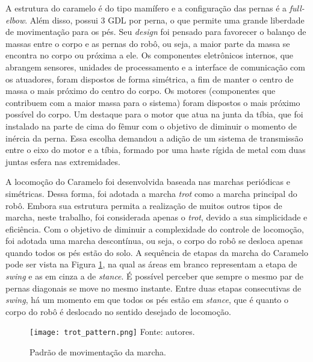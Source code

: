 \documentclass[../main.tex]{subfiles}
\begin{document}
A estrutura do caramelo é do tipo mamífero e a configuração das pernas é a \textit{full-elbow}. Além disso, possui 3 GDL por perna, o que permite uma grande liberdade de movimentação para os pés. Seu \textit{design} foi pensado para favorecer o balanço de massas entre o corpo e as pernas do robô, ou seja, a maior parte da massa se encontra no corpo ou próxima a ele. Os componentes eletrônicos internos, que abrangem sensores, unidades de processamento e a interface de comunicação com os atuadores, foram dispostos de forma simétrica, a fim de manter o centro de massa o mais próximo do centro do corpo. Os motores (componentes que contribuem com a maior massa para o sistema) foram dispostos o mais próximo possível do corpo. Um destaque para o motor que atua na junta da tíbia, que foi instalado na parte de cima do fêmur com o objetivo de diminuir o momento de inércia da perna. Essa escolha demandou a adição de um sistema de transmissão entre o eixo do motor e a tíbia, formado por uma haste rígida de metal com duas juntas esfera nas extremidades.

A locomoção do Caramelo foi desenvolvida baseada nas marchas periódicas e simétricas. Dessa forma, foi adotada a marcha \textit{trot} como a marcha principal do robô. Embora sua estrutura permita a realização de muitos outros tipos de marcha, neste trabalho, foi considerada apenas o \textit{trot}, devido a sua simplicidade e eficiência. Com o objetivo de diminuir a complexidade do controle de locomoção, foi adotada uma marcha descontínua, ou seja, o corpo do robô se desloca apenas quando todos os pés estão do solo. A sequência de etapas da marcha do Caramelo pode ser vista na Figura \ref{fig:trot_pattern}, na qual as áreas em branco representam a etapa de \textit{swing} e as em cinza a de \textit{stance}. É possível perceber que sempre o mesmo par de pernas diagonais se move no mesmo instante. Entre duas etapas consecutivas de \textit{swing}, há um momento em que todos os pés estão em \textit{stance}, que é quanto o corpo do robô é deslocado no sentido desejado de locomoção.

\begin{figure}[h]
  \caption{Padrão de movimentação da marcha.}
  \centering
  \texttt{[image: trot\_pattern.png]}
  \vfill
  Fonte: autores.
  \label{fig:trot_pattern}
\end{figure}
\end{document}
